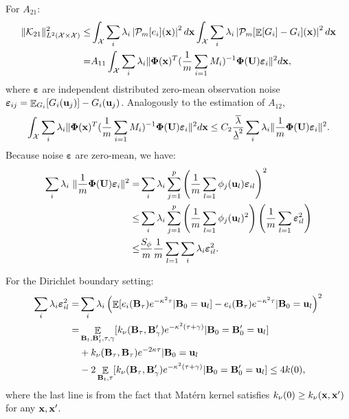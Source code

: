 \documentclass[aos,preprint]{imsart}
\theoremstyle{plain}
\DeclareMathOperator{\E}{\mathbb E}
\newcommand{\CalX}{\mathcal X}
\newcommand{\CalP}{\mathcal P}
\newcommand{\CalK}{\mathcal K}
\newcommand{\Bx}{\bold x}
\newcommand{\BFx}{\bold x}
\newcommand{\BB}{\bold B}
\newcommand{\BU}{\bold U}
\newcommand{\Bu}{\bold u}
\newcommand{\BPhi}{\boldsymbol{\Phi}}
\theoremstyle{remark}
\begin{document}
\begin{appendix}
For $A_{21}$:
\begin{align*}
    \|\CalK_{21}\|_{L^2(\CalX\times\CalX)}^2\leq &\int_{\CalX}\sum_i\lambda_i\left|\CalP_m[e_i](\BFx)\right|^2d\BFx\int_{\CalX}\sum_i\lambda_i\left|\CalP_m[ \E[G_i]-G_i](\BFx)\right|^2d\BFx\\
    = & A_{11} \int_{\CalX} \sum_i\lambda_i \|\BPhi(\Bx)^T(\frac{1}{m}\sum_{i=1}M_i)^{-1}\BPhi(\BU)\boldsymbol{\varepsilon}_i\|^2d\Bx,
\end{align*}
where $\boldsymbol{\varepsilon}$ are independent distributed zero-mean observation noise $\boldsymbol{\varepsilon}_{ij}=\E_{G_i}[G_i(\Bu_j)]-G_i(\Bu_j)$. Analogously to the estimation of $A_{12}$, 
\begin{align*}
    \int_{\CalX} \sum_i\lambda_i \|\BPhi(\Bx)^T(\frac{1}{m}\sum_{i=1}M_i)^{-1}\BPhi(\BU)\boldsymbol{\varepsilon}_i\|^2d\Bx\leq C_2\frac{\overline{\lambda}}{\underline{\lambda}^2}\sum_i\lambda_i\|\frac{1}{m}\BPhi(\BU)\boldsymbol{\varepsilon}_i\|^2.
\end{align*}
Because noise $\boldsymbol{\varepsilon}$ are zero-mean, we have:
\begin{align*}
    \sum_i\lambda_i\ \|\frac{1}{m}\BPhi(\BU)\boldsymbol{\varepsilon}_i\|^2 
    =& \sum_i \lambda_i \sum_{j=1}^p\left(\frac{1}{m}\sum_{l=1}\phi_j(\Bu_l)\boldsymbol{\varepsilon}_{il}\right)^2\\
    \leq & \sum_i\lambda_i \sum_{j=1}^p\left(\frac{1}{m}\sum_{l=1}\phi_j(\Bu_l)^2\right)\left(\frac{1}{m}\sum_{l=1}\boldsymbol{\varepsilon}_{il}^2\right)\\
    \leq & \frac{S_\phi}{m}\frac{1}{m}\sum_{l=1}\sum_i\lambda_i \boldsymbol{\varepsilon}_{il}^2.
\end{align*}

For the Dirichlet boundary setting:
\begin{align*}
    \sum_i\lambda_i \boldsymbol{\varepsilon}_{il}^2 = &  \sum_i\lambda_i\left(\E[e_i(\BB_{\tau})e^{-\kappa^2\tau}|\BB_0=\Bu_l]- e_i(\BB_{\tau})e^{-\kappa^2\tau}|\BB_0=\Bu_l\right)^2\\
    =&  \E_{\BB_t,\BB'_t,\tau,\gamma}[k_\nu(\BB_\tau,\BB'_\gamma)e^{-\kappa^2(\tau+\gamma)}|\BB_0=\BB'_0=\Bu_l]\\
    &+k_\nu(\BB_\tau,\BB_\tau)e^{-2\kappa\tau}|\BB_0=\Bu_l\\
    &-2\E_{\BB_t,\tau}[k_\nu(\BB_\tau,\BB'_\gamma)e^{-\kappa^2(\tau+\gamma)}|\BB_0=\BB'_0=\Bu_l]
    \leq 4k(0),
\end{align*}
where the last line is from the fact that Mat\'ern kernel satisfies $k_\nu(0)\geq k_\nu(\Bx,\Bx')$ for any $\Bx,\Bx'$.


\end{appendix}
\end{document}
